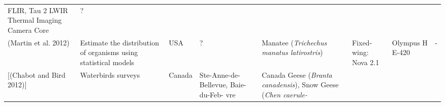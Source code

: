 \documentclass[]{interact}
\theoremstyle{plain}%
\theoremstyle{definition}
\theoremstyle{remark}
\begin{document}
\begin{longtable}[]{@{}llllllll@{}}
\begin{minipage}[t]{0.11\columnwidth}
FLIR, Tau 2 LWIR Thermal Imaging Camera Core\strut
\end{minipage} & \begin{minipage}[t]{0.01\columnwidth}\raggedright\strut
?\strut
\end{minipage}\tabularnewline
\begin{minipage}[t]{0.11\columnwidth}\raggedright\strut
(Martin et al. 2012)\strut
\end{minipage} & \begin{minipage}[t]{0.18\columnwidth}\raggedright\strut
Estimate the distribution of organisms using statistical models\strut
\end{minipage} & \begin{minipage}[t]{0.03\columnwidth}\raggedright\strut
USA\strut
\end{minipage} & \begin{minipage}[t]{0.14\columnwidth}\raggedright\strut
?\strut
\end{minipage} & \begin{minipage}[t]{0.10\columnwidth}\raggedright\strut
Manatee (\emph{Trichechus manatus latirostris})\strut
\end{minipage} & \begin{minipage}[t]{0.09\columnwidth}\raggedright\strut
Fixed-wing: Nova 2.1\strut
\end{minipage} & \begin{minipage}[t]{0.11\columnwidth}\raggedright\strut
Olympus H E-420\strut
\end{minipage} & \begin{minipage}[t]{0.01\columnwidth}\raggedright\strut
-\strut
\end{minipage}\tabularnewline
\begin{minipage}[t]{0.11\columnwidth}\raggedright\strut
{[}(Chabot and Bird 2012){]}\strut
\end{minipage} & \begin{minipage}[t]{0.18\columnwidth}\raggedright\strut
Waterbirds surveys\strut
\end{minipage} & \begin{minipage}[t]{0.03\columnwidth}\raggedright\strut
Canada\strut
\end{minipage} & \begin{minipage}[t]{0.14\columnwidth}\raggedright\strut
Ste-Anne-de-Bellevue, Baie-du-Feb- vre\strut
\end{minipage} & \begin{minipage}[t]{0.10\columnwidth}\raggedright\strut
Canada Geese (\emph{Branta canadensis}), Snow Geese (\emph{Chen caerule-
}
\end{minipage}
\end{longtable}
\end{document}
